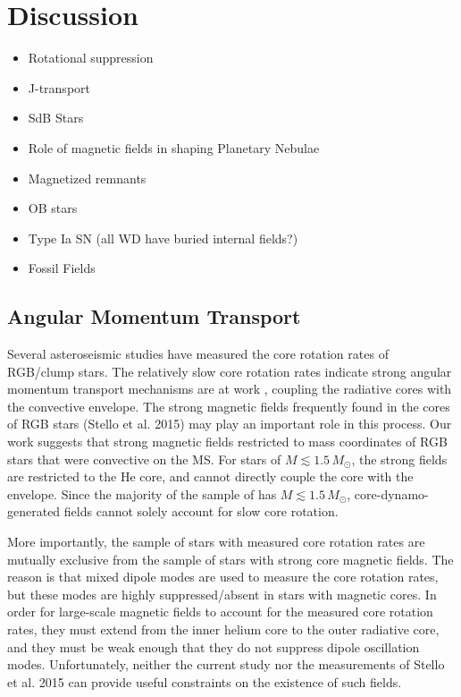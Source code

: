 \section{Discussion}
\begin{itemize}
\item Rotational suppression
\item J-transport
\item SdB Stars
\item Role of magnetic fields in shaping Planetary Nebulae
\item Magnetized remnants
\item OB stars
\item Type Ia SN (all WD have buried internal fields?)
\item Fossil Fields
\end{itemize}


\subsection{Angular Momentum Transport}

Several asteroseismic studies \citep{Beck_2012,Mosser_2012,Deheuvels_2014,Deheuvels_2015} have measured the core rotation rates of RGB/clump stars. The relatively slow core rotation rates indicate strong angular momentum transport mechanisms are at work \citep{Cantiello_2014}, coupling the radiative cores with the convective envelope. The strong magnetic fields frequently found in the cores of RGB stars (Stello et al. 2015) may play an important role in this process. Our work suggests that strong magnetic fields restricted to mass coordinates of RGB stars that were convective on the MS. For stars of $M \lesssim 1.5 \, M_\odot$, the strong fields are restricted to the He core, and cannot directly couple the core with the envelope. Since the majority of the sample of \cite{Mosser_2012} has $M \lesssim 1.5 \, M_\odot$, core-dynamo-generated fields cannot solely account for slow core rotation.

More importantly, the sample of stars with measured core rotation rates are mutually exclusive from the sample of stars with strong core magnetic fields. The reason is that mixed dipole modes are used to measure the core rotation rates, but these modes are highly suppressed/absent in stars with magnetic cores. In order for large-scale magnetic fields to account for the measured core rotation rates, they must extend from the inner helium core to the outer radiative core, and they must be weak enough that they do not suppress dipole oscillation modes. Unfortunately, neither the current study nor the measurements of Stello et al. 2015 can provide useful constraints on the existence of such fields. 


